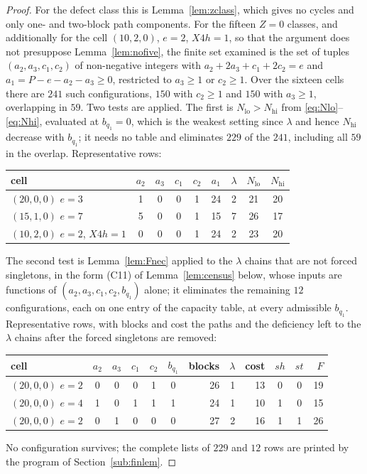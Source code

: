 \documentclass[10pt]{article}
\theoremstyle{remark}
\theoremstyle{plain}
\begin{document}
\begin{proof}
For the defect class this is Lemma~\ref{lem:zclass}, which gives no
cycles and only one- and two-block path components.  For the fifteen
$Z=0$ classes, and additionally for the cell $(10,2,0)$, $e=2$,
$X4h=1$, so that the argument does not presuppose
Lemma~\ref{lem:nofive}, the finite set examined is the set of tuples
$(a_2,a_3,c_1,c_2)$ of non-negative integers with
$a_2+2a_3+c_1+2c_2=e$ and $a_1=P-e-a_2-a_3\ge 0$, restricted to
$a_3\ge 1$ or $c_2\ge 1$.  Over the sixteen cells there are $241$ such
configurations, $150$ with $c_2\ge 1$ and $150$ with $a_3\ge 1$,
overlapping in $59$.  Two tests are applied.  The first is
$N_{\mathrm{lo}}>N_{\mathrm{hi}}$ from \eqref{eq:Nlo}--\eqref{eq:Nhi},
evaluated at $b_{q_1}=0$, which is the weakest setting since $\lambda$
and hence $N_{\mathrm{hi}}$ decrease with $b_{q_1}$; it needs no table
and eliminates $229$ of the $241$, including all $59$ in the overlap.
Representative rows:
\begin{center}\small
\begin{tabular}{@{}l cccc c c cc@{}}
\toprule
cell & $a_2$&$a_3$&$c_1$&$c_2$ & $a_1$ & $\lambda$ &
$N_{\mathrm{lo}}$ & $N_{\mathrm{hi}}$\\
\midrule
$(20,0,0)$ $e{=}3$ & 1&0&0&1 & 24 & 2 & 21 & 20\\
$(15,1,0)$ $e{=}7$ & 5&0&0&1 & 15 & 7 & 26 & 17\\
$(10,2,0)$ $e{=}2$, $X4h{=}1$ & 0&0&0&1 & 24 & 2 & 23 & 20\\
\bottomrule
\end{tabular}
\end{center}
The second test is
Lemma~\ref{lem:Fnec} applied to the $\lambda$ chains that are not
forced singletons, in the form (C11) of Lemma~\ref{lem:census} below,
whose inputs are functions of $(a_2,a_3,c_1,c_2,b_{q_1})$ alone; it
eliminates the remaining $12$ configurations, each on one entry of the
capacity table, at every admissible $b_{q_1}$.  Representative rows, with blocks and
cost the paths and the deficiency left to the $\lambda$ chains after
the forced singletons are removed:
\begin{center}\small
\begin{tabular}{@{}l ccccc r r r cc r@{}}
\toprule
cell & $a_2$&$a_3$&$c_1$&$c_2$&$b_{q_1}$ &
blocks & $\lambda$ & cost & $\mathit{sh}$&$\mathit{st}$ & $F$\\
\midrule
$(20,0,0)$ $e{=}2$ & 0&0&0&1&0 & 26 & 1 & 13 & 0&0 & 19\\
$(20,0,0)$ $e{=}4$ & 1&0&1&1&1 & 24 & 1 & 10 & 1&0 & 15\\
$(20,0,0)$ $e{=}2$ & 0&1&0&0&0 & 27 & 2 & 16 & 1&1 & 26\\
\bottomrule
\end{tabular}
\end{center}
No configuration survives; the complete lists of $229$ and $12$ rows
are printed by the program of Section~\ref{sub:finlem}.
\end{proof}
\end{document}
